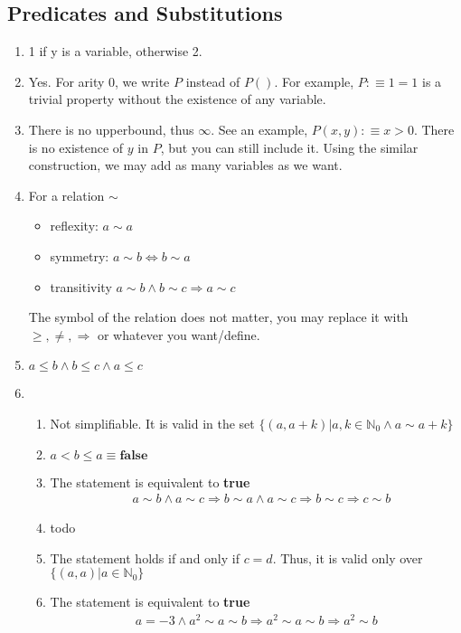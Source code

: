 \documentclass[12pt]{article}
\begin{document}
\subsection*{Predicates and Substitutions}
\begin{enumerate}
    \item 1 if y is a variable, otherwise 2.
    \item Yes. For arity 0, we write $P$ instead of $P()$. 
    For example, $P :\equiv 1 = 1$ is a trivial property without the existence of any variable.
    \item There is no upperbound, thus $\infty$. See an example, $P(x, y) :\equiv x > 0$. 
    There is no existence of $y$ in $P$, but you can still include it. Using the similar 
    construction, we may add as many variables as we want.
    \item For a relation $\sim$
    \begin{itemize}
        \item reflexity: $a \sim a$
        \item symmetry: $a \sim b \iff b \sim a$
        \item transitivity $a \sim b \land b \sim c \Longrightarrow a \sim c$
    \end{itemize}
    The symbol of the relation does not matter, you may replace it with $\geq, \not=, \Longrightarrow$ or whatever you want/define.
    \item $a \leq b \land b \leq c \land a \leq c$
    \item 
    \begin{enumerate}
        \item Not simplifiable. It is valid in the set $\{(a, a + k) | a, k \in \mathbb{N}_0 \land a \sim a + k\}$
        \item $a < b \leq a \equiv \textbf{false}$
        \item The statement is equivalent to \textbf{true} \begin{align*}
            &a \sim b \land a \sim c
            \Longrightarrow b \sim a \land a \sim c
            \Longrightarrow b \sim c
            \Longrightarrow c \sim b 
        \end{align*}
        \item todo
        \item The statement holds if and only if $c = d$.
        Thus, it is valid only over $\{(a, a) | a \in \mathbb{N}_0\}$
        \item The statement is equivalent to \textbf{true} \begin{align*}
            a = -3 \land a^2 \sim a \sim b \Longrightarrow a^2 \sim a \sim b \Longrightarrow a^2 \sim b
        \end{align*}
    \end{enumerate}
\end{enumerate}
\end{document}
